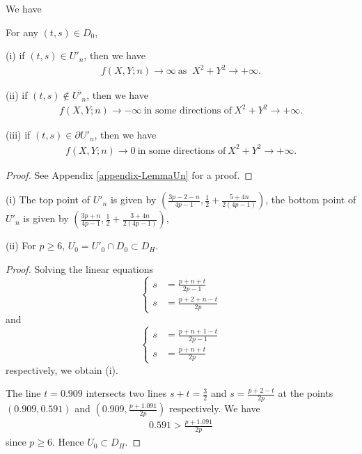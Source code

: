 \documentclass[12pt]{amsart}
\begin{document}
We have
\begin{lemma} \label{lemma-UnnotUn}
For any $(t,s)\in D_0$, 

(i) if $(t,s)\in U'_n$, then we have 
\begin{align}
    f(X,Y;n)\rightarrow \infty \ \text{as } \ X^2+Y^2\rightarrow +\infty.
\end{align}

(ii) if $(t,s)\notin \overline{U'_n}$, then we have 
\begin{align}
    f(X,Y;n)\rightarrow -\infty \ \text{in some directions of} \  X^2+Y^2\rightarrow +\infty.
\end{align}

(iii) if $(t,s)\in \partial{U'_n}$, then we have 
\begin{align}
    f(X,Y;n)\rightarrow 0 \  \text{in some directions of} \  X^2+Y^2\rightarrow +\infty.
\end{align}
\end{lemma}
\begin{proof}
    See Appendix \ref{appendix-LemmaUn} for a proof. 
\end{proof}


\begin{lemma} \label{lemma-topbottom}
(i) The top point of $U'_n$ is given by $(\frac{3p-2-n}{4p-1},\frac{1}{2}+\frac{5+4n}{2(4p-1)})$, the bottom point of $U'_n$ is given by $(\frac{3p+n}{4p-1},\frac{1}{2}+\frac{3+4n}{2(4p-1)})$,

(ii) For $p\geq 6$, $U_0=U'_0\cap D_0\subset D_{H}$.   
\end{lemma}
\begin{proof}
    Solving the linear equations
\begin{equation} 
\left\{ \begin{aligned}
         s&=\frac{p+n+t}{2p-1} \\
                s&=\frac{p+2+n-t}{2p}
                          \end{aligned} \right.
                          \end{equation}
and 
\begin{equation} \label{eq:2}
\left\{ \begin{aligned}
         s&=\frac{p+n+1-t}{2p-1} \\
                s&=\frac{p+n+t}{2p}
                          \end{aligned} \right.
                          \end{equation}
                          respectively, we obtain (i).

The line $t=0.909$ intersects two lines $s+t=\frac{3}{2}$ and $s=\frac{p+2-t}{2p}$ at the points $(0.909,0.591)$ and $(0.909,\frac{p+1.091}{2p})$ respectively. We have
\begin{align}
    0.591>\frac{p+1.091}{2p}
\end{align}
since $p\geq 6$. Hence $U_0\subset D_{H}$. 
\end{proof}
\end{document}
